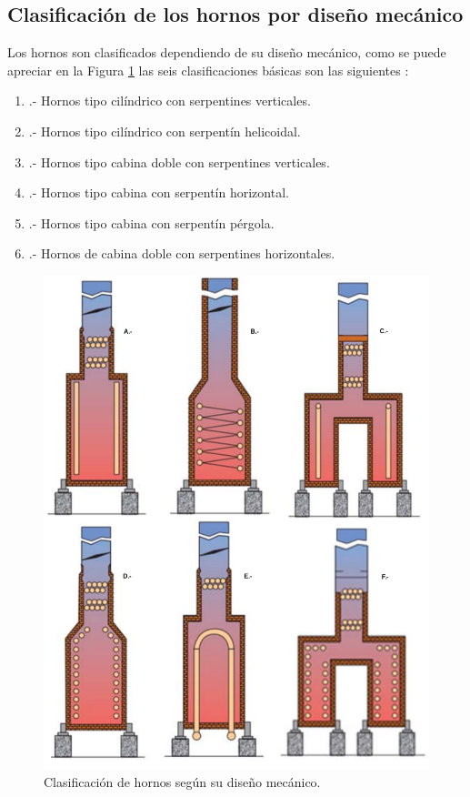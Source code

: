 \subsection{Clasificación de los hornos por diseño mecánico}
\par Los hornos son clasificados dependiendo de su diseño mecánico, como se puede apreciar en la Figura \ref{fig:hornos_tipos} las seis clasificaciones básicas son las siguientes \cite{pdvsa1}:
\begin{enumerate}[label=\Alph*]
    \item .-  Hornos tipo cilíndrico con serpentines verticales.
    \item .-  Hornos tipo cilíndrico con serpentín helicoidal.
    \item .-  Hornos tipo cabina doble con serpentines verticales.
    \item .-  Hornos tipo cabina con serpentín horizontal.
    \item .-  Hornos tipo cabina con serpentín pérgola.
    \item .-  Hornos de cabina doble con serpentines horizontales.
\end{enumerate}
\begin{figure}[hbt] \begin{center}
\includegraphics[scale=0.30]{images/hornos_tipos}
\caption[Tipos de hornos por diseño mecánico]{Clasificación de hornos según su diseño mecánico.\cite{kumar}}
\label{fig:hornos_tipos}
\end{center} \end{figure}

